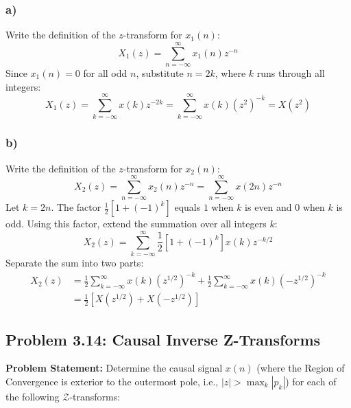\documentclass[12pt,a4paper]{article}
\begin{document}
\subsubsection*{a)}
Write the definition of the $z$-transform for $x_1(n)$:
\[
X_1(z) = \sum_{n=-\infty}^{\infty} x_1(n)z^{-n}
\]
Since $x_1(n) = 0$ for all odd $n$, substitute $n = 2k$, where $k$ runs through all integers:
\[
X_1(z) = \sum_{k=-\infty}^{\infty} x(k)z^{-2k} = \sum_{k=-\infty}^{\infty} x(k)\left(z^2\right)^{-k} = X\left(z^2\right)
\]

\subsubsection*{b)}
Write the definition of the $z$-transform for $x_2(n)$:
\[
X_2(z) = \sum_{n=-\infty}^{\infty} x_2(n)z^{-n} = \sum_{n=-\infty}^{\infty} x(2n)z^{-n}
\]
Let $k = 2n$. The factor $\frac{1}{2}\left[1 + (-1)^k\right]$ equals $1$ when $k$ is even and $0$ when $k$ is odd. Using this factor, extend the summation over all integers $k$:
\[
X_2(z) = \sum_{k=-\infty}^{\infty} \frac{1}{2}\left[1 + (-1)^k\right]x(k)z^{-k/2}
\]
Separate the sum into two parts:
\[
\begin{aligned}
X_2(z) &= \frac{1}{2}\sum_{k=-\infty}^{\infty} x(k)\left(z^{1/2}\right)^{-k} + \frac{1}{2}\sum_{k=-\infty}^{\infty} x(k)\left(-z^{1/2}\right)^{-k} \\
&= \frac{1}{2}\left[X\left(z^{1/2}\right) + X\left(-z^{1/2}\right)\right]
\end{aligned}
\]

\subsection{Problem 3.14: Causal Inverse Z-Transforms}
\textbf{Problem Statement:} Determine the causal signal $x(n)$ (where the Region of Convergence is exterior to the outermost pole, i.e., $|z| > \max_k |p_k|$) for each of the following $\mathcal{Z}$-transforms:
\end{document}
